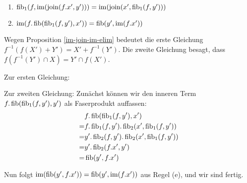 \begin{lemm} $\quad$ %
\begin{enumerate}
\item $\operatorname{fib}_1(f,\operatorname{im}(\operatorname{join}(f.x',y'))) = \operatorname{im}(\operatorname{join}(x',\operatorname{fib}_1(f,y')))$
\item $\operatorname{im}(f.\operatorname{fib}(\operatorname{fib}_1(f,y'),x')) = \operatorname{fib}(y',\operatorname{im}(f.x'))$
\end{enumerate}
Wegen Proposition \ref{im-join-im-elim} bedeutet die erste Gleichung $f^{-1}(f(X')+Y') = X' + f^{-1}(Y')$.
Die zweite Gleichung besagt, dass $f(f^{-1}(Y')\cap X) = Y' \cap f(X')$.
\end{lemm}
\begin{bew}

Zur ersten Gleichung:


Zur zweiten Gleichung:
Zunächst können wir den inneren Term $f.\operatorname{fib}(\operatorname{fib}_1(f,y'),y')$ als Faserprodukt auffassen:
\begin{align*}
   & f.\operatorname{fib}(\operatorname{fib}_1(f,y'),x')
\\=& f.\operatorname{fib}_1(f,y').\operatorname{fib}_2(x',\operatorname{fib}_1(f,y'))
\\=& y'.\operatorname{fib}_2(f,y').\operatorname{fib}_2(x',\operatorname{fib}_1(f,y'))
\\=& y'.\operatorname{fib}_2(f.x',y')
\\=& \operatorname{fib}(y',f.x')
\end{align*}

Nun folgt $\operatorname{im}(\operatorname{fib}(y',f.x')) = \operatorname{fib}(y',\operatorname{im}(f.x'))$ aus Regel (e), und wir sind fertig.
\end{bew}
